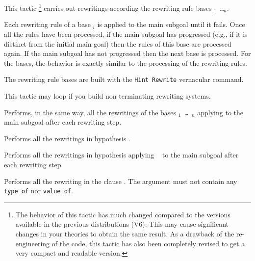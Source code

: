 This tactic \footnote{The behavior of this tactic has much changed compared to
the versions available in the previous distributions (V6). This may cause
significant changes in your theories to obtain the same result. As a drawback
of the re-engineering of the code, this tactic has also been completely revised
to get a very compact and readable version.} carries out rewritings according
the rewriting rule bases {\tt \ident$_1$ \dots \ident$_n$}.

Each rewriting rule of a base \ident$_i$ is applied to the main subgoal until
it fails. Once all the rules have been processed, if the main subgoal has
progressed (e.g., if it is distinct from the initial main goal) then the rules
of this base are processed again. If the main subgoal has not progressed then
the next base is processed. For the bases, the behavior is exactly similar to
the processing of the rewriting rules.

The rewriting rule bases are built with the {\tt Hint~Rewrite} vernacular
command.

\Warning{} This tactic may loop if you build non terminating rewriting systems.

\begin{Variant}
\item {}

Performs, in the same way, all the rewritings of the bases {\tt \ident$_1$
\mbox{\dots} \ident$_n$} applying {\tt \tac} to the main subgoal after each
rewriting step.

\item {}

  Performs all the rewritings in hypothesis {\qualid}.
\item {}

  Performs all  the rewritings  in hypothesis {\qualid}  applying {\tt
    \tac} to the main subgoal after each rewriting step.

\item {}

  Performs all the rewriting  in the clause .
  The  argument must not contain any \texttt{type of} nor \texttt{value of}.

\end{Variant}

